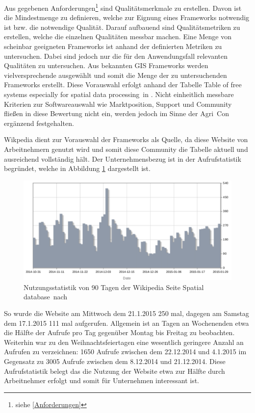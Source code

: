 Aus gegebenen Anforderungen\footnote{siehe \ref{Anforderungen}} sind Qualitätsmerkmale zu erstellen.
Davon ist die Mindestmenge zu definieren, welche zur Eignung eines Frameworks notwendig ist bzw. die notwendige Qualität.
Darauf aufbauend sind Qualitätsmetriken zu erstellen, welche die einzelnen Qualitäten messbar machen.
Eine Menge von scheinbar geeigneten Frameworks ist anhand der definierten Metriken zu untersuchen.
Dabei sind jedoch nur die für den Anwendungsfall relevanten Qualitäten zu untersuchen.
Aus bekannten GIS Frameworks werden vielversprechende ausgewählt und somit die Menge der zu untersuchenden Frameworks erstellt.
\label{aufrufe-spatialdatabases}
Diese Vorauswahl erfolgt anhand der Tabelle \glqq Table of free systems especially for spatial data processing\grqq\ in \cite{website:wiki-spatialdatabase}.
Nicht einheitlich messbare Kriterien zur Softwareauswahl wie Marktposition, Support und Community fließen in diese Bewertung nicht ein, werden jedoch im Sinne der Agri~Con ergänzend festgehalten.

Wikpedia dient zur Vorauswahl der Frameworks als Quelle, da diese Website von Arbeitnehmern genutzt wird und somit diese Community die Tabelle aktuell und ausreichend vollständig hält.
Der Unternehmensbezug ist in der Aufrufstatistik begründet, welche in Abbildung \ref{fig:wiki-usage-spatialdatabase} dargestellt ist.
\begin{figure}
\centering
\includegraphics[width=\textwidth]{Abbildungen/wiki-spatialdatabase-usage.pdf}
\caption[Nutzungsstatistik der Wikipedia Seite spatial database]{Nutzungsstatistik von 90 Tagen der Wikipedia Seite \glqq Spatial database\grqq\ nach \cite{website:wiki-usage-spatialdatabase}}
\label{fig:wiki-usage-spatialdatabase}
\end{figure}
So wurde die Website am Mittwoch dem 21.1.2015 250 mal, dagegen am Samstag dem 17.1.2015 111 mal aufgerufen.
Allgemein ist an Tagen an Wochenenden etwa die Hälfte der Aufrufe pro Tag gegenüber Montag bis Freitag zu beobachten.
Weiterhin war zu den Weihnachtsfeiertagen eine wesentlich geringere Anzahl an Aufrufen zu verzeichnen: 1650 Aufrufe zwischen dem 22.12.2014 und 4.1.2015 im Gegensatz zu 3005 Aufrufe zwischen dem 8.12.2014 und 21.12.2014.
Diese Aufrufstatistik belegt das die Nutzung der Website etwa zur Hälfte durch Arbeitnehmer erfolgt und somit für Unternehmen interessant ist.

